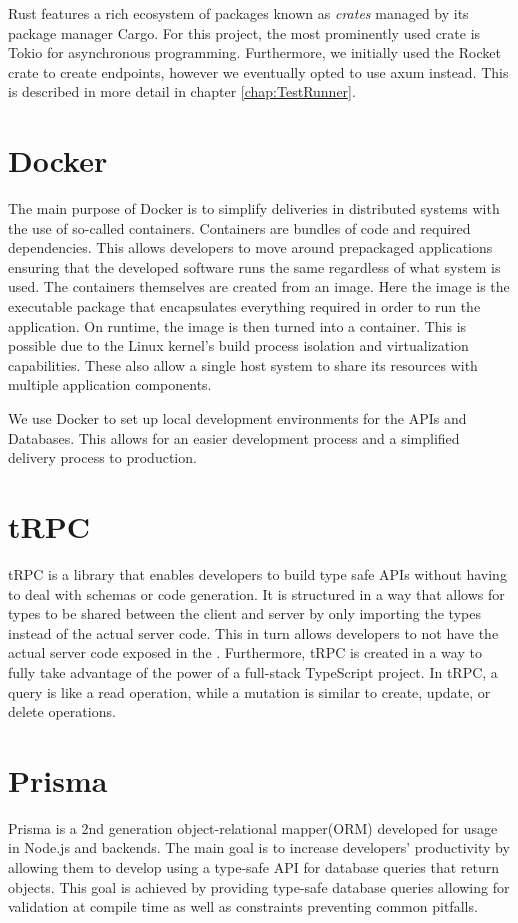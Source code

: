 Rust features a rich ecosystem of packages known as \textit{crates} managed by its package manager Cargo\cite{Cargo}.
For this project, the most prominently used crate is Tokio\cite{Tokio} for asynchronous programming.
Furthermore, we initially used the Rocket\cite{Rocket} crate to create endpoints, however we eventually opted to use axum\cite{axum} instead.
This is described in more detail in chapter \ref{chap:TestRunner}.

\section*{Docker}
The main purpose of Docker is to simplify deliveries in distributed systems with the use of so-called containers\cite{Docker_Container}.
Containers are bundles of code and required dependencies. This allows developers to move around prepackaged applications ensuring that the developed software runs the same regardless of what system is used\cite{Docker_Container}.
The containers themselves are created from an image. Here the image is the executable package that encapsulates everything required in order to run the application. On runtime, the image is then turned into a container.
This is possible due to the Linux kernel's build process isolation and virtualization capabilities. These also allow a single host system to share its resources with multiple application components\cite{Docker_Container}.

We use Docker to set up local development environments for the APIs and Databases. This allows for an easier development process and a simplified delivery process to production.

\section*{tRPC}
tRPC is a library that enables developers to build type safe APIs without having to deal with schemas or code generation.
It is structured in a way that allows for types to be shared between the client and server by only importing the types instead of the actual server code.
This in turn allows developers to not have the actual server code exposed in the \frontend{}.
Furthermore, tRPC is created in a way to fully take advantage of the power of a full-stack TypeScript project\cite{tRPC}.
In tRPC, a query is like a read operation, while a mutation is similar to create, update, or delete operations.

\section*{Prisma}
Prisma is a 2nd generation object-relational mapper(ORM) developed for usage in Node.js and \typescript{} backends.
The main goal is to increase developers' productivity by allowing them to develop using a type-safe API for database queries that return \javascript{} objects.
This goal is achieved by providing type-safe database queries allowing for validation at compile time as well as constraints preventing common pitfalls\cite{Prisma_Why}.

